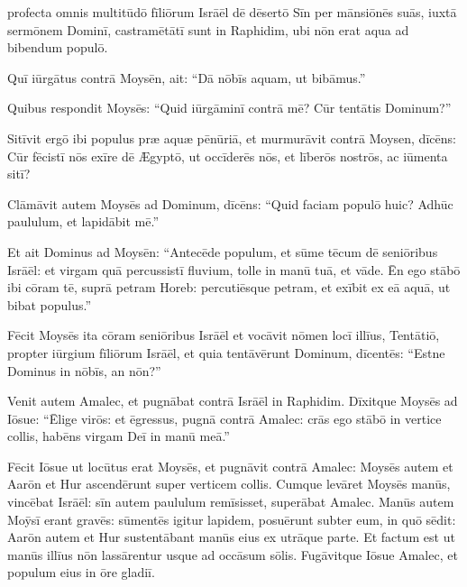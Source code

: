 

\thispagestyle{empty}


 profecta omnis multitūdō fīliōrum Isrāēl dē
dēsertō Sīn per mānsiōnēs suās, iuxtā sermōnem Dominī,
castramētātī sunt in Raphidim, ubi nōn
erat aqua ad bibendum populō. 

Quī iūrgātus contrā
Moysēn, ait: ``Dā nōbīs aquam, ut bibāmus.''

Quibus respondit Moysēs: ``Quid iūrgāminī contrā mē? Cūr
tentātis Dominum?''

Sitīvit ergō ibi populus præ aquæ pēnūriā, et
murmurāvit contrā Moysen,
dīcēns: Cūr fēcistī nōs exīre dē Ægyptō, ut occīderēs nōs, et līberōs
nostrōs, ac iūmenta sitī? 

Clāmāvit autem Moysēs ad
Dominum, dīcēns: ``Quid faciam populō huic? Adhūc paululum,
et lapidābit mē.''

Et ait Dominus ad Moysēn:
``Antecēde populum, et sūme tēcum dē seniōribus Isrāēl: et
virgam quā percussistī fluvium, tolle in manū tuā, et vāde. 
Ēn ego stābō ibi cōram tē, suprā petram
Horeb: percutiēsque petram, et exībit ex eā aquā, ut bibat
populus.''

Fēcit Moysēs ita cōram seniōribus Isrāēl 
et vocāvit nōmen locī
illīus, Tentātiō, propter iūrgium fīliōrum
Isrāēl, et quia tentāvērunt Dominum, dīcentēs: ``Estne Dominus in nōbīs, an
nōn?''

Venit autem Amalec, et pugnābat contrā Isrāēl in Raphidim.
Dīxitque Moysēs ad Iōsue: ``Ēlige virōs: et ēgressus, pugnā contrā Amalec:
crās ego stābō in vertice collis, habēns virgam Deī in manū
meā.''

Fēcit Iōsue ut locūtus erat Moysēs, et pugnāvit contrā Amalec:
Moysēs autem et Aarōn et Hur ascendērunt super verticem
collis. 
Cumque levāret Moysēs manūs, vincēbat Isrāēl: sīn autem
paululum remīsisset, superābat Amalec. 
Manūs autem Moȳsī
erant gravēs: sūmentēs igitur lapidem, posuērunt
subter eum, in quō sēdit: Aarōn autem et Hur
sustentābant manūs eius ex utrāque parte. Et factum est ut
manūs illīus nōn lassārentur usque ad occāsum sōlis. 
Fugāvitque Iōsue Amalec, et populum eius in ōre gladiī. 

